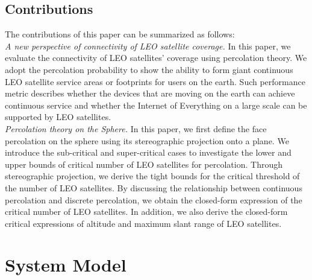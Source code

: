 \documentclass[final]{IEEEtran}
\begin{document}
\subsection{Contributions}
The contributions of this paper can be summarized as follows:\\
\indent \textit{A new perspective of connectivity of LEO satellite coverage.} In this paper, we evaluate the connectivity of LEO satellites' coverage using percolation theory. We adopt the percolation probability to show the ability to form giant continuous LEO satellite service areas or footprints for users on the earth. Such performance metric describes whether the devices that are moving on the earth can achieve continuous service and whether the Internet of Everything on a large scale can be supported by LEO satellites. \\
\indent \textit{Percolation theory on the Sphere.} In this paper, we first define the face percolation on the sphere using its stereographic projection onto a plane. We introduce the sub-critical and super-critical cases to investigate the lower and upper bounds of critical number of LEO satellites for percolation. Through stereographic projection, we derive the tight bounds for the critical threshold of the number of LEO satellites. By discussing the relationship between continuous percolation and discrete percolation, we obtain the closed-form expression of the critical number of LEO satellites. In addition, we also derive the closed-form critical expressions of altitude and maximum slant range of LEO satellites.\\

\section{System Model} \label{sec:SysMod}
\end{document}
